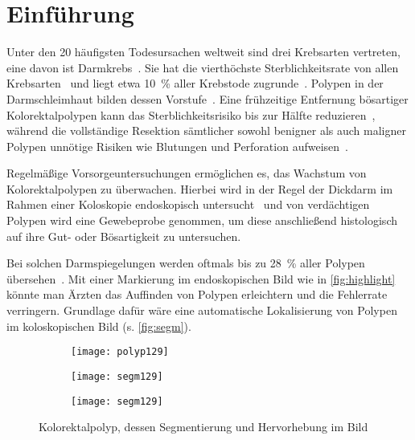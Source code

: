 \chapter{Einführung}

Unter den 20 häufigsten Todesursachen weltweit sind drei Krebsarten vertreten, eine davon ist Darmkrebs~\cite{Lozano.2012}.
Sie hat die vierthöchste Sterblichkeitsrate von allen Krebsarten~\cite{Ferlay.2012} und liegt etwa 10~\% aller Krebstode zugrunde~\cite{Kumar.2005}.
Polypen in der Darmschleimhaut bilden dessen Vorstufe~\cite{Kumar.2005}.
Eine frühzeitige Entfernung bösartiger Kolorektalpolypen kann das Sterblichkeitsrisiko bis zur Hälfte reduzieren~\cite{Zauber.2012}, während die vollständige Resektion sämtlicher sowohl benigner als auch maligner Polypen unnötige Risiken wie Blutungen und Perforation aufweisen~\cite{Rex.2009}.

Regelmäßige Vorsorgeuntersuchungen ermöglichen es, das Wachstum von Kolorektalpolypen zu überwachen.
Hierbei wird in der Regel der Dickdarm im Rahmen einer Koloskopie endoskopisch untersucht~\cite{Kumar.2005} und von verdächtigen Polypen wird eine Gewebeprobe genommen, um diese anschließend histologisch auf ihre Gut- oder Bösartigkeit zu untersuchen.

Bei solchen Darmspiegelungen werden oftmals bis zu 28~\% aller Polypen übersehen~\cite{Leufkens.2012}.
Mit einer Markierung im endoskopischen Bild wie in \autoref{fig:highlight} könnte man Ärzten das Auffinden von Polypen erleichtern und die Fehlerrate verringern.
Grundlage dafür wäre eine automatische Lokalisierung von Polypen im koloskopischen Bild (s. \autoref{fig:segm}).

\begin{figure}[ht]
	\begin{subfigure}{.3\textwidth}
		\centering
		\texttt{[image: polyp129]}
		\caption{}
		\label{fig:polyp}
	\end{subfigure}
	\begin{subfigure}{.3\textwidth}
		\centering
		\texttt{[image: segm129]}
		\caption{}
		\label{fig:segm}
	\end{subfigure}
	\begin{subfigure}{.3\textwidth}
		\centering
		\texttt{[image: segm129]}
		\caption{}
		\label{fig:highlight}
	\end{subfigure}
	\caption{Kolorektalpolyp, dessen Segmentierung und Hervorhebung im Bild~\cite{Vazquez.2017}}
	\label{fig:polypseg}
\end{figure}

